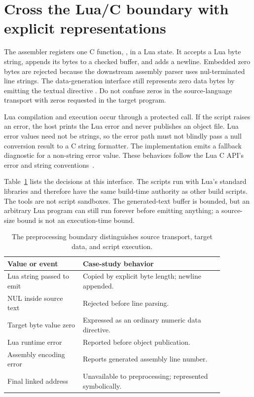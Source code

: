 \section{Cross the Lua/C boundary with explicit representations}
\label{sec:ch55-lua-api}

The assembler registers one C function, , in a Lua state.
It accepts a Lua byte string, appends its bytes to a checked buffer, and adds a newline.
Embedded zero bytes are rejected because the downstream assembly parser uses nul-terminated line strings.
The data-generation interface still represents zero data bytes by emitting the textual directive .
Do not confuse zeros in the source-language transport with zeros requested in the target program.

Lua compilation and execution occur through a protected call.
If the script raises an error, the host prints the Lua error and never publishes an object file.
Lua error values need not be strings, so the error path must not blindly pass a null conversion result to a C string formatter.
The implementation emits a fallback diagnostic for a non-string error value.
These behaviors follow the Lua C API's error and string conventions~\cite{ierusalimschy-2026-lua}.

Table~\ref{tab:ch55-boundaries} lists the decisions at this interface.
The scripts run with Lua's standard libraries and therefore have the same build-time authority as other build scripts.
The tools are not script sandboxes.
The generated-text buffer is bounded, but an arbitrary Lua program can still run forever before emitting anything; a source-size bound is not an execution-time bound.

\begin{table}[htbp]
\caption{The preprocessing boundary distinguishes source transport, target data, and script execution.}
\label{tab:ch55-boundaries}
\centering
\begin{tabular}{p{0.30\linewidth}p{0.57\linewidth}}
\toprule
Value or event & Case-study behavior \\
\midrule
Lua string passed to emit & Copied by explicit byte length; newline appended. \\
NUL inside source text & Rejected before line parsing. \\
Target byte value zero & Expressed as an ordinary numeric data directive. \\
Lua runtime error & Reported before object publication. \\
Assembly encoding error & Reports generated assembly line number. \\
Final linked address & Unavailable to preprocessing; represented symbolically. \\
\bottomrule
\end{tabular}
\end{table}

